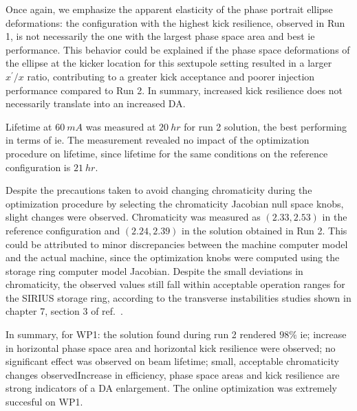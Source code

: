 Once again, we emphasize the apparent elasticity of the phase portrait ellipse deformations: the configuration with the highest kick resilience, observed in Run 1, is not necessarily the one with the largest phase space area and best \gls*{ie} performance. This behavior could be explained if the phase space deformations of the ellipse at the kicker location for this sextupole setting resulted in a larger $x^\prime/x$ ratio, contributing to a greater kick acceptance and poorer injection performance compared to Run 2. In summary, increased kick resilience does not necessarily translate into an increased \gls*{DA}.

Lifetime at $60~\unit{mA}$ was measured at $20~\unit{hr}$ for run 2 solution, the best performing in terms of \gls*{ie}. The measurement revealed no impact of the optimization procedure on lifetime, since lifetime for the same conditions on the reference configuration is $21~\unit{hr}$.

Despite the precautions taken to avoid changing chromaticity during the optimization procedure by selecting the chromaticity Jacobian null space knobs, slight changes were observed. Chromaticity was measured as $(2.33, 2.53)$ in the reference configuration and $(2.24, 2.39)$ in the solution obtained in Run 2. This could be attributed to minor discrepancies between the machine computer model and the actual machine, since the optimization knobs were computed using the storage ring computer model Jacobian. Despite the small deviations in chromaticity, the observed values still fall within acceptable operation ranges for the SIRIUS storage ring, according to the transverse instabilities studies shown in chapter 7, section 3 of ref.~\cite{sa_study_2018}.

In summary, for \gls*{WP1}: the solution found during run 2 rendered $98\%$ \gls*{ie}; increase in horizontal phase space area and horizontal kick resilience were observed; no significant effect was observed on beam lifetime; small, acceptable chromaticity changes observedIncrease in efficiency, phase space areas and kick resilience are strong indicators of a \gls*{DA} enlargement. The online optimization was extremely succesful on \gls*{WP1}.

